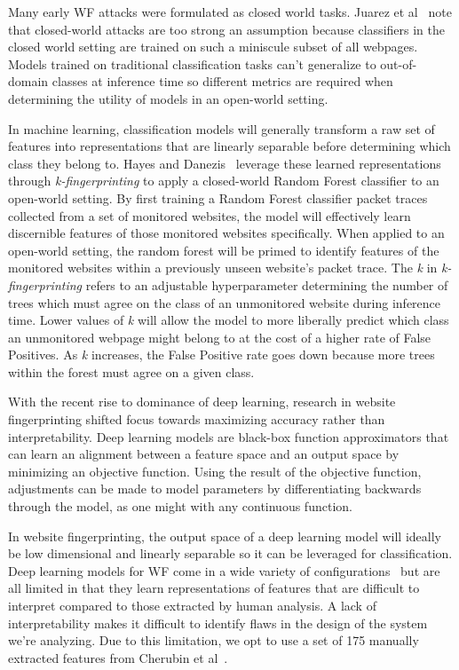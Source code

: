 \documentclass[sigconf,authorversion,nonacm]{acmart}
\begin{document}
Many early WF attacks were formulated as closed world tasks. Juarez et al~\citep{juarez2014critical} note that closed-world attacks are too strong an assumption because classifiers in the closed world setting are trained on such a miniscule subset of all webpages. Models trained on traditional classification tasks can't generalize to out-of-domain classes at inference time so different metrics are required when determining the utility of models in an open-world setting.

In machine learning, classification models will generally transform a raw set of features into representations that are linearly separable before determining which class they belong to. Hayes and Danezis~\citep{hayes2016k} leverage these learned representations through \textit{k-fingerprinting} to apply a closed-world Random Forest classifier to an open-world setting. By first training a Random Forest classifier packet traces collected from a set of monitored websites, the model will effectively learn discernible features of those monitored websites specifically. When applied to an open-world setting, the random forest will be primed to identify features of the monitored websites within a previously unseen website's packet trace. The \textit{k} in \textit{k-fingerprinting} refers to an adjustable hyperparameter determining the number of trees which must agree on the class of an unmonitored website during inference time. Lower values of \textit{k} will allow the model to more liberally predict which class an unmonitored webpage might belong to at the cost of a higher rate of False Positives. As \textit{k} increases, the False Positive rate goes down because more trees within the forest must agree on a given class. 

With the recent rise to dominance of deep learning, research in website fingerprinting shifted focus towards maximizing accuracy rather than interpretability. Deep learning models are black-box function approximators that can learn an alignment between a feature space and an output space by minimizing an objective function. Using the result of the objective function, adjustments can be made to model parameters by differentiating backwards through the model, as one might with any continuous function. 

In website fingerprinting, the output space of a deep learning model will ideally be low dimensional and linearly separable so it can be leveraged for classification. Deep learning models for WF come in a wide variety of configurations~\citep{sirinam2018deep,sirinam2019triplet,rimmer2017automated} but are all limited in that they learn representations of features that are difficult to interpret compared to those extracted by human analysis. A lack of interpretability makes it difficult to identify flaws in the design of the system we're analyzing. Due to this limitation, we opt to use a set of 175 manually extracted features from Cherubin et al~\citep{cherubin2017bayes}.
\end{document}
